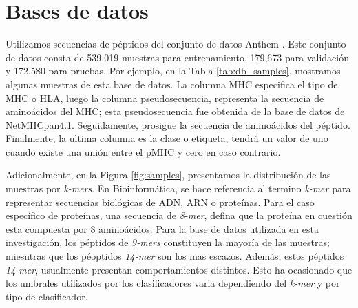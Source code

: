 \section{Bases de datos}
Utilizamos secuencias de péptidos del conjunto de datos Anthem \citep{mei2021anthem}. Este conjunto de datos consta de 539,019 muestras para entrenamiento, 179,673 para validación y 172,580 para pruebas. Por ejemplo, en la Tabla \ref{tab:db_samples}, mostramos algunas muestras de esta base de datos. La columna MHC especifica el tipo de MHC o HLA, luego la columna pseudosecuencia, representa la secuencia de aminoácidos del MHC; esta pseudosecuencia fue obtenida de la base de datos de NetMHCpan4.1. Seguidamente, prosigue la secuencia de aminoácidos del péptido. Finalmente, la ultima columna es la clase o etiqueta, tendrá un valor de uno cuando existe una unión entre el pMHC y cero en caso contrario.


Adicionalmente, en la Figura \ref{fig:samples}, presentamos la distribución de las muestras por \textit{k-mers}. En Bioinformática, se hace referencia al termino \textit{k-mer} para representar secuencias biológicas de ADN, ARN o proteínas. Para el caso específico de proteínas, una secuencia de \textit{8-mer}, defina que la proteína en cuestión esta compuesta por 8 aminoácidos. Para la base de datos utilizada en esta investigación, los péptidos de \textit{9-mers} constituyen la mayoría de las muestras; miesntras que los péoptidos \textit{14-mer} son los mas escazos. Además, estos péptidos \textit{14-mer}, usualmente presentan comportamientos distintos. Esto ha ocasionado que los umbrales utilizados por los clasificadores varia dependiendo del \textit{k-mer} y por tipo de clasificador. 




